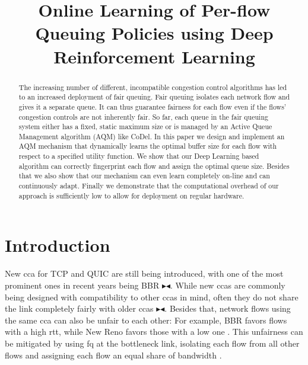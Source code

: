 \documentclass[conference]{IEEEtran}
\newcommand{\mynote}[3]{
    \fbox{\bfseries\sffamily\scriptsize#1}
    {\small$\blacktriangleright$\textsf{\emph{\color{#3}{#2}}}$\blacktriangleleft$}}
\newcommand{\todo}[1]{\mynote{TODO}{#1}{red}}
\begin{document}
\title{Online Learning of Per-flow Queuing Policies using Deep Reinforcement Learning}

\author{
}

\maketitle

\begin{abstract}
The increasing number of different, incompatible congestion control algorithms has led to an increased deployment of fair queuing. Fair queuing isolates each network flow and gives it a separate queue. It can thus guarantee fairness for each flow even if the flows' congestion controls are not inherently fair. So far, each queue in the fair queuing system either has a fixed, static maximum size or is managed by an Active Queue Management algorithm (AQM) like CoDel. In this paper we design and implement an AQM mechanism that dynamically learns the optimal buffer size for each flow with respect to a specified utility function. We show that our Deep Learning based algorithm can correctly fingerprint each flow and assign the optimal queue size. Besides that we also show that our mechanism can even learn completely on-line and can continuously adapt. Finally we demonstrate that the computational overhead of our approach is sufficiently low to allow for deployment on regular hardware. 
\end{abstract}

\section{Introduction}

New \gls{cca} for TCP and QUIC are still being introduced, with one of the most prominent ones in recent years being BBR \cite{cardwell_bbr:_2016}\todo{Add more refs}. While new \glspl{cca} are commonly being designed with compatibility to other \glspl{cca} in mind, often they do not share the link completely fairly with older \glspl{cca}\todo{Add more refs}. Besides that, network flows using the same \gls{cca} can also be unfair to each other: For example, BBR favors flows with a high \gls{rtt}, while New Reno favors those with a low one \cite{turkovic_interactions_2019,turkovic_fifty_2019}. This unfairness can be mitigated by using \gls{fq} at the bottleneck link, isolating each flow from all other flows and assigning each flow an equal share of bandwidth \cite{dumazet_pkt_sched:_2013}. 
\end{document}
